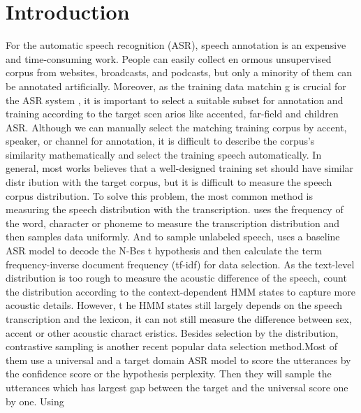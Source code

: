 \section{Introduction}
For the automatic speech recognition (ASR), speech annotation is an expensive and time-consuming work. People can easily collect en
ormous unsupervised corpus from websites, broadcasts, and podcasts, but only a minority of them can be annotated artificially.
Moreover, as the training data matchin
g is crucial for the ASR system \cite{is_robust,robust-wav2vec}, it is important to select a suitable subset for annotation and training according to the target scen
arios like accented\cite{google-accent}, far-field\cite{ami-pre} and children\cite{childern} ASR.
Although we can manually select the matching training corpus by 
accent, speaker, or channel for annotation, it is difficult to describe the corpus's similarity mathematically and select the training speech automatically.  
In general, most works\cite{es-ivector,es-gmm-u,es-gmm-u2,select-text, select-text2,es-nbest,es-gmm-s} believes that a well-designed training set should have similar distr
ibution with the target corpus, but it is difficult to measure the speech corpus distribution.
To solve this problem, the most common method is measuring the speech 
distribution with the transcription\cite{select-text, select-text2, es-nbest, es-gmm-s}. \cite{select-text} uses the frequency of the word, character or phoneme to 
measure the transcription distribution and then samples data uniformly. And to sample unlabeled speech, \cite{es-nbest} uses a baseline ASR model to decode the N-Bes
t hypothesis and then calculate the term frequency-inverse document frequency (tf-idf) for data selection.
As the text-level distribution is too rough to measure the
 acoustic difference of the speech, \cite{es-gmm-s} count the distribution according to the context-dependent HMM states to capture more acoustic details. However, t
he HMM states still largely depends on the speech transcription and the lexicon, it can not still measure the difference between sex, accent or other acoustic charact
eristics.
Besides selection by the distribution, contrastive sampling\cite{contrastive-selection,cs-gmm,accent-selection,contrastive-ds2,contrastive-new,google-ds} 
is another recent popular data selection method.Most of them use
a universal and a target domain ASR model to score the
utterances by the confidence score or the hypothesis perplexity.
Then they will sample the utterances which has largest gap
between the target and the universal score one by one. Using
